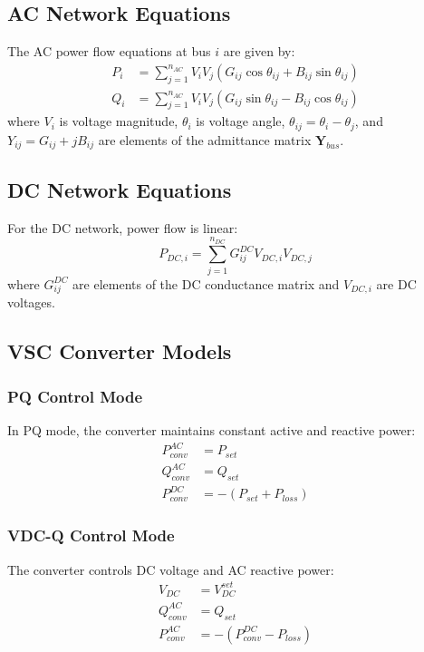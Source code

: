 \documentclass[11pt]{article}
\begin{document}
\subsection{AC Network Equations}

The AC power flow equations at bus $i$ are given by:
\begin{align}
P_i &= \sum_{j=1}^{n_{AC}} V_i V_j (G_{ij} \cos\theta_{ij} + B_{ij} \sin\theta_{ij}) \label{eq:ac_p} \\
Q_i &= \sum_{j=1}^{n_{AC}} V_i V_j (G_{ij} \sin\theta_{ij} - B_{ij} \cos\theta_{ij}) \label{eq:ac_q}
\end{align}
where $V_i$ is voltage magnitude, $\theta_i$ is voltage angle, $\theta_{ij} = \theta_i - \theta_j$, and $Y_{ij} = G_{ij} + jB_{ij}$ are elements of the admittance matrix $\mathbf{Y}_{bus}$.

\subsection{DC Network Equations}

For the DC network, power flow is linear:
\begin{equation}
P_{DC,i} = \sum_{j=1}^{n_{DC}} G_{ij}^{DC} V_{DC,i} V_{DC,j}
\label{eq:dc_power}
\end{equation}
where $G_{ij}^{DC}$ are elements of the DC conductance matrix and $V_{DC,i}$ are DC voltages.

\subsection{VSC Converter Models}

\subsubsection{PQ Control Mode}
In PQ mode, the converter maintains constant active and reactive power:
\begin{align}
P_{conv}^{AC} &= P_{set} \\
Q_{conv}^{AC} &= Q_{set}\\
P_{conv}^{DC} &= -(P_{set} + P_{loss})
\end{align}

\subsubsection{VDC-Q Control Mode}
The converter controls DC voltage and AC reactive power:
\begin{align}
V_{DC} &= V_{DC}^{set} \\
Q_{conv}^{AC} &= Q_{set} \\
P_{conv}^{AC} &= -(P_{conv}^{DC} - P_{loss})
\end{align}
\end{document}
